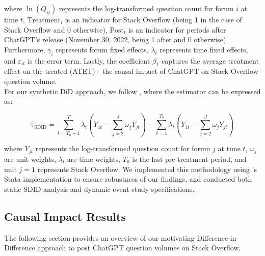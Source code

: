 where $\ln(Q_{it})$ represents the log-transformed question count for forum $i$ at time $t$, $\text{Treatment}_i$ is an indicator for Stack Overflow (being 1 in the case of Stack Overflow and 0 otherwise), $\text{Post}_t$ is an indicator for periods after ChatGPT's release (November 30, 2022, being 1 after and 0 otherwise).  Furthermore, $\gamma_i$ represents forum fixed effects, $\lambda_t$ represents time fixed effects, and $\varepsilon_{it}$ is the error term. Lastly, the coefficient $\beta_1$ captures the average treatment effect on the treated (ATET) - the causal impact of ChatGPT on Stack Overflow question volume.\\

For our synthetic DiD approach, we follow \textcite{arkhangelsky_synthetic_2021}, where the estimator can be expressed as:

\begin{equation}\label{eq:synthdid}
\hat{\tau}_{\text{SDID}} = \sum_{t=T_0+1}^T \lambda_t \left( Y_{1t} - \sum_{j=2}^J \omega_j Y_{jt} \right) - \sum_{t=1}^{T_0} \lambda_t \left( Y_{1t} - \sum_{j=2}^J \omega_j Y_{jt} \right)
\end{equation}

where $Y_{jt}$ represents the log-transformed question count for forum $j$ at time $t$, $\omega_j$ are unit weights, $\lambda_t$ are time weights, $T_0$ is the last pre-treatment period, and unit $j=1$ represents Stack Overflow. We implemented this methodology using \textcite{clarke_synthetic_2023, ciccia_short_2024}'s Stata implementation to ensure robustness of our findings, and conducted both static SDID analysis and dynamic event study specifications.


\subsection{Causal Impact Results}

The following section provides an overview of our motivating Difference-in-Difference approach to post ChatGPT question volumes on Stack Overflow.


